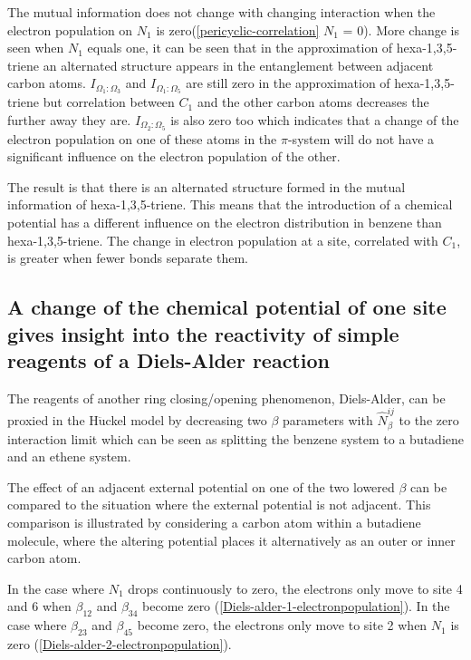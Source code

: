 \documentclass[twoside,twocolumn,9pt]{article}
\begin{document}
  The mutual information does not change with changing interaction when the electron population on $N_1$ is zero(\cref{pericyclic-correlation} $N_1$ = 0). More change is seen when $N_1$ equals one, it can be seen that in the approximation of hexa-1,3,5-triene an alternated structure appears in the entanglement between adjacent carbon atoms. 
  $I_{\Omega_1:\Omega_3}$ and $I_{\Omega_1:\Omega_5}$ are still zero in the approximation of hexa-1,3,5-triene but correlation between $C_1$ and the other carbon atoms decreases the further away they are. $I_{\Omega_2:\Omega_5}$ is also zero too which indicates that a change of the electron population on one of these atoms in the $\pi$-system will do not have a significant influence on the electron population of the other.
  
  The result is that there is an alternated structure formed in the mutual information of hexa-1,3,5-triene. This means that the introduction of a chemical potential has a different influence on the electron distribution in benzene than hexa-1,3,5-triene. The change in electron population at a site, correlated with $C_1$, is greater when fewer bonds separate them.

\subsection{A change of the chemical potential of one site gives insight into the reactivity of simple reagents of a Diels-Alder reaction}

The reagents of another ring closing/opening phenomenon, Diels-Alder, can be proxied in the H$\ddot{\text{u}}$ckel model by decreasing two $\beta$ parameters with $\hat{N}_{\beta}^{ij}$ to the zero interaction limit which can be seen as splitting the benzene system to a butadiene and an ethene system.

The effect of an adjacent external potential on one of the two lowered $\beta$ can be compared to the situation where the external potential is not adjacent. This comparison is illustrated by considering a carbon atom within a butadiene molecule, where the altering potential places it alternatively as an outer or inner carbon atom.

In the case where $N_1$ drops continuously to zero, the electrons only move to site 4 and 6 when $\beta_{12}$ and  $\beta_{34}$  become zero (\cref{Diels-alder-1-electronpopulation}). In the case where $\beta_{23}$ and  $\beta_{45}$ become zero, the electrons only move to site 2 when $N_1$ is zero (\cref{Diels-alder-2-electronpopulation}).
\end{document}
